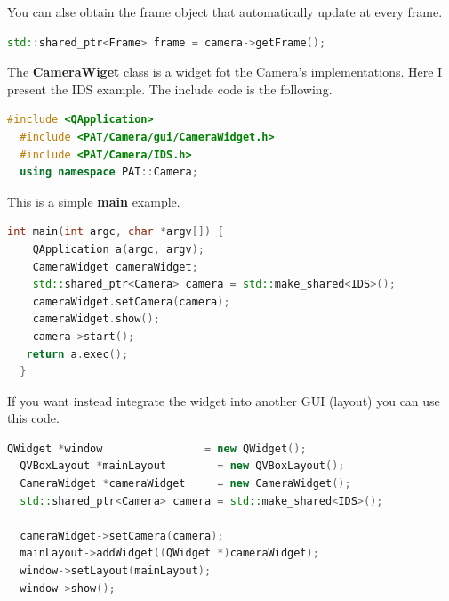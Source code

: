 You can alse obtain the frame object that automatically update at
every frame.

\begin{lstlisting}[language=c++, gobble=2]
  std::shared_ptr<Frame> frame = camera->getFrame();
\end{lstlisting}


The \textbf{CameraWiget} class is a widget fot the Camera's
implementations. Here I present the IDS example. The include code is the
following.

\begin{lstlisting}[language=c++, gobble=2]
  #include <QApplication>
  #include <PAT/Camera/gui/CameraWidget.h>
  #include <PAT/Camera/IDS.h>
  using namespace PAT::Camera;
\end{lstlisting}

This is a simple \textbf{main} example.

\begin{lstlisting}[language=c++, gobble=2]
  int main(int argc, char *argv[]) {
    QApplication a(argc, argv);
    CameraWidget cameraWidget;
    std::shared_ptr<Camera> camera = std::make_shared<IDS>();
    cameraWidget.setCamera(camera);
    cameraWidget.show();
    camera->start();
   return a.exec();
  }
\end{lstlisting}

If you want instead integrate the widget into another GUI (layout) you
can use this code.

\begin{lstlisting}[language=c++, gobble=2]
  QWidget *window                = new QWidget();
  QVBoxLayout *mainLayout        = new QVBoxLayout();
  CameraWidget *cameraWidget     = new CameraWidget();
  std::shared_ptr<Camera> camera = std::make_shared<IDS>();
  
  cameraWidget->setCamera(camera);
  mainLayout->addWidget((QWidget *)cameraWidget);
  window->setLayout(mainLayout);
  window->show();
\end{lstlisting}

